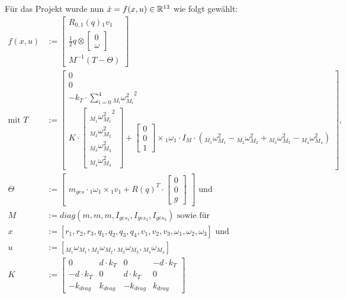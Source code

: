 Für das Projekt wurde nun $\dot{x} = f(x, u) \in \mathbb{R}^{13}$ wie folgt gewählt:
\begin{align}\label{gl:ODE}
  f(x, u) &:= 
  \begin{bmatrix}
    R_{0, 1}(q) {_{1}v_{1}} \\
    \frac{1}{2} q \otimes \begin{bmatrix} 0 \\ \omega \end{bmatrix} \\
    M^{-1} (T - \Theta)
  \end{bmatrix} \\
  \text{mit } 
  T &:= \begin{bmatrix} 0\\ 0\\ -k_T \cdot \sum_{i=0}^{4}  {_{M_i} {\omega}^2_{M_i}}^2 \\ 
   K \cdot \begin{bmatrix} {_{M_1} {\omega}^2_{M_1}}^2 \\ {_{M_2} {\omega}^2_{M_2}} \\ {_{M_3} {\omega}^2_{M_3}} \\ {_{M_4} {\omega}^2_{M_4}} \end{bmatrix} +  \begin{bmatrix} 0 \\ 0 \\ 1\end{bmatrix} \times {_{1}\omega_{1}} \cdot I_M \cdot ({_{M_1} {\omega}^2_{M_1}} - {_{M_2} {\omega}^2_{M_2}} + {_{M_3} {\omega}^2_{M_3}} - {_{M_4} {\omega}^2_{M_4}})
  \end{bmatrix}
  \text{, } \\
  \Theta &:= \begin{bmatrix} m_{ges} \cdot {_{1}\omega_{1}} \times {_{1}v_{1}} + R(q)^T \cdot \begin{bmatrix} 0 \\ 0 \\ g \end{bmatrix} 
  \end{bmatrix} \text{ und } \\
  M &:= diag(m, m, m, I_{ges_1}, I_{ges_2}, I_{ges_3}) \text{ sowie für }\\
  x &:=[r_1, r_2, r_3, q_1, q_2, q_3, q_4, v_1, v_2, v_3, \omega_1, \omega_2, \omega_3 ] \text{ und } \\
  u &:=[{_{M_1} {\omega}_{M_1}}, {_{M_2} {\omega}_{M_2}}, {_{M_3} {\omega}_{M_3}}, {_{M_4} {\omega}_{M_4}}]\\
  K&:= \begin{bmatrix} 0              & d \cdot k_{T} & 0             & -d \cdot k_{T} \\ 
                       -d \cdot k_{T} & 0             & d \cdot k_{T} & 0  \\
                       -k_{drag}      & k_{drag}      & -k_{drag}    & k_{drag}
       \end{bmatrix}
\end{align}





